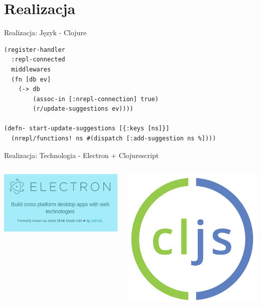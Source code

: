 \documentclass[presentation]{beamer}
\begin{document}
\section{Realizacja}
\label{sec-3}
\begin{frame}[fragile,label=sec-3-1]{Realizacja: Język - Clojure}
 \begin{verbatim}
(register-handler
  :repl-connected
  middlewares
  (fn [db ev]
    (-> db
        (assoc-in [:nrepl-connection] true)
        (r/update-suggestions ev))))

(defn- start-update-suggestions [{:keys [ns]}]
  (nrepl/functions! ns #(dispatch [:add-suggestion ns %])))
\end{verbatim}
\end{frame}
\begin{frame}[label=sec-3-2]{Realizacja: Technologia - Electron + Clojurescript}
\begin{columns}
\begin{column}{0.6\textwidth}
\includegraphics[width=.9\linewidth]{img/electron-logo.png}
\end{column}
\begin{column}{0.4\textwidth}
\includegraphics[width=.9\linewidth]{./img/cljs-logo.png}
\end{column}
\end{columns}
\end{frame}
\end{document}
